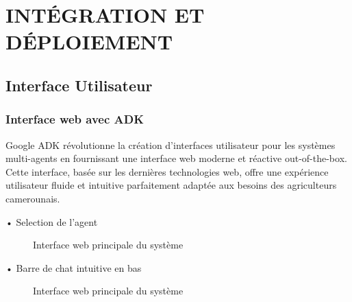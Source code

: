 \chapter*{ INTÉGRATION ET DÉPLOIEMENT}

\section{Interface Utilisateur}

\subsection{Interface web avec ADK}

Google ADK révolutionne la création d'interfaces utilisateur pour les systèmes multi-agents en fournissant une interface web moderne et réactive out-of-the-box. Cette interface, basée sur les dernières technologies web, offre une expérience utilisateur fluide et intuitive parfaitement adaptée aux besoins des agriculteurs camerounais.

• Selection de l'agent\\
\begin{figure}[H]
\centering
{}
\caption{Interface web principale du système}
\end{figure}

• Barre de chat intuitive en bas\\
\begin{figure}[H]
\centering
{}
\caption{Interface web principale du système}
\end{figure}

